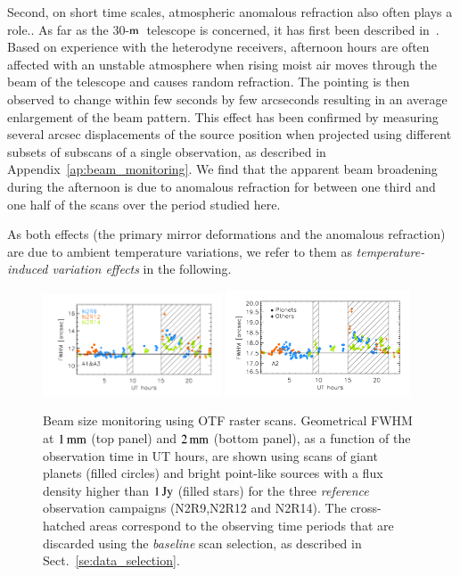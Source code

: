 \documentclass[traditionalabstract]{aa}
\newcommand{\trentemetre}{30-$\rm{m}$}
\newcommand{\lp}[1]{#1}
\begin{document}
Second, on short time scales, atmospheric anomalous refraction {\lp also often plays a
  role.}. As far as the \trentemetre\ telescope is concerned, it has first
been described in~\citet{Altenhoff1987}. Based on experience with
  the heterodyne receivers, afternoon hours are
  often affected with an unstable atmosphere when rising moist air moves
  through the beam of the telescope and causes random refraction. The pointing
  is then observed to change within few seconds by few arcseconds {\lp resulting in an average
    enlargement of the beam pattern.} This effect has been confirmed by
  measuring several arcsec displacements of the source position when projected using
  different subsets of subscans of a single observation, as described
  in Appendix~\ref{ap:beam_monitoring}. We find that the apparent beam broadening during
  the afternoon is due to anomalous refraction for between one third
  and one half of the scans over the period studied here.


{\lp As both effects (the primary mirror deformations and the anomalous
  refraction) are due to ambient temperature variations, we refer to them as
  \emph{temperature-induced variation effects} in the following.}\\

\begin{figure}[ht!]
  \begin{center}
    \includegraphics[clip=true, trim={0.9cm, 0.5cm, 0.5cm, 0.5cm}, width=0.4725\textwidth]{Figures/Beam_monitoring_with_otfs_vs_ut_1mm.pdf}
    \includegraphics[clip=true, trim={0.5cm, 0.5cm, 0.5cm, 0.5cm}, width=0.4875\textwidth]{Figures/Beam_monitoring_with_otfs_vs_ut_a2.pdf}
    \caption[Beam size monitoring using OTF scans]{Beam size
      monitoring using OTF raster scans. Geometrical FWHM at $1\,\rm{mm}$ (top panel)
      and $2\,\rm{mm}$ (bottom panel), as a function of the
      observation time in UT hours, are shown using scans of giant
      planets (filled circles) and bright point-like sources with a
      flux density higher than $1\,\rm{Jy}$ (filled stars) for the three \emph{reference}
      observation campaigns (N2R9,N2R12 and N2R14). The cross-hatched areas
      correspond to the observing time periods that are discarded using
      the \emph{baseline} scan selection, as described in Sect.~\ref{se:data_selection}.} 
\label{fig:beam_monitoring_otf}
  \end{center}
\end{figure}
\end{document}
